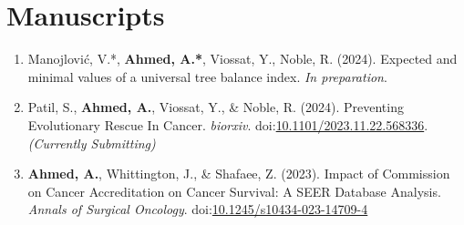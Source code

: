 \documentclass[letterpaper,11pt]{article}
\newcommand{\resumeItem}[2]{
  \item\small{
    \textbf{#1}{#2 \vspace{-2pt}}
  }
}
\newcommand{\resumeSubItem}[2]{\resumeItem{#1}{#2}\vspace{-4pt}}
\begin{document}
\section{Manuscripts}
  \begin{enumerate}[leftmargin=*]
  \resumeSubItem{}
    {Manojlovi\'c, V.*, \textbf{Ahmed, A.*}, Viossat, Y., Noble, R. (2024). Expected and minimal values of a universal tree balance index. \textit{In preparation}.}
  \resumeSubItem{}
    {Patil, S., \textbf{Ahmed, A.}, Viossat, Y., \& Noble, R. (2024). Preventing Evolutionary Rescue In Cancer. \textit{biorxiv}. doi:\href{https://doi.org/10.1101/2023.11.22.568336 }{10.1101/2023.11.22.568336}. \textit{(Currently Submitting)}}
  \resumeSubItem{}
    {\textbf{Ahmed, A.}, Whittington, J., \& Shafaee, Z. (2023). Impact of Commission on Cancer Accreditation on Cancer Survival: A SEER Database Analysis. \textit{Annals of Surgical Oncology}. doi:\href{https://doi.org/10.1245/s10434-023-14709-4}{10.1245/s10434-023-14709-4}}
  \end{enumerate}
  \vspace{-4pt}
\end{document}
